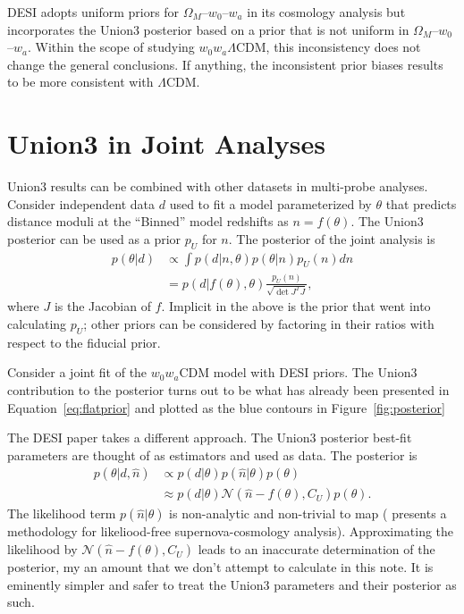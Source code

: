 \documentclass[11pt,a4paper]{article}
\begin{document}
DESI  adopts uniform priors for $\Omega_M$--$w_0$--$w_a$ in its cosmology analysis
but incorporates the Union3 posterior based on a prior that is not uniform in $\Omega_M$--$w_0$--$w_a$.
Within the scope of studying $w_0w_a\Lambda$CDM, this inconsistency does not change the general conclusions.
If anything, the inconsistent prior biases results to be more consistent with $\Lambda$CDM.

\section{Union3 in Joint Analyses}
Union3 results can be combined with other datasets in multi-probe analyses.
Consider independent data $d$ used to fit a model parameterized by $\theta$
that predicts distance moduli at the ``Binned'' model redshifts as $n=f(\theta)$.
The Union3 posterior can be used as a prior $p_U$ for $n$.  The posterior of the joint analysis is
\begin{align}
p(\theta|d) &\propto \int  p(d|n,\theta)p(\theta|n)p_U(n) dn\\
&=  p(d|f(\theta),\theta) \frac{p_U(n)} {\sqrt{\det{J^TJ}}}, \label{eq:correct}
\end{align}
where $J$ is the Jacobian of $f$.
Implicit in the above is the prior
that went into calculating $p_U$; other priors can be considered by factoring in their ratios with respect to the 
fiducial prior.

Consider a joint fit of the  $w_0w_a$CDM model with DESI priors.  The Union3 contribution to the posterior turns out to be
what has already been presented in 
Equation~\ref{eq:flatprior} and plotted as the blue contours in
Figure~\ref{fig:posterior} 

The DESI paper takes a different approach.  The Union3 posterior best-fit parameters are thought of as estimators and used as
 data.  The posterior is
\begin{align}
p(\theta | d, \hat{n}) & \propto p(d| \theta) p( \hat{n}| \theta) p(\theta) \\
& \approx p(d| \theta) \mathcal{N}( \hat{n}-f(\theta) , C_U) p(\theta) \label{eq:DESI}.
\end{align}
The  likelihood
 term $ p( \hat{n}| \theta)$ is non-analytic and non-trivial to map
(\cite{2013ApJ...764..116W} presents a methodology for  likeliood-free supernova-cosmology analysis).
Approximating the likelihood
by $\mathcal{N}( \hat{n}-f(\theta) , C_U)$ leads to an inaccurate determination
of the posterior, my an amount that we don't attempt to calculate in this note.
It is eminently simpler and safer to treat the Union3 parameters and their posterior as such.
\end{document}
